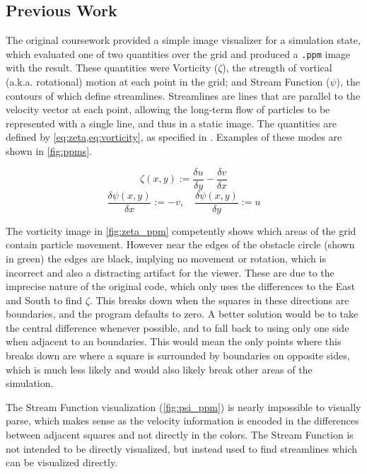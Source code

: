 \subsection{Previous Work}
The original coursework\cite{modules:CS257Coursework} provided a simple image visualizer for a simulation state, which evaluated one of two quantities over the grid and produced a \texttt{.ppm} image with the result.
These quantities were Vorticity ($\zeta$), the strength of vortical (a.k.a. rotational) motion at each point in the grid; and Stream Function ($\psi$), the contours of which define streamlines.
Streamlines are lines that are parallel to the velocity vector at each point, allowing the long-term flow of particles to be represented with a single line, and thus in a static image.\cite{NASADefinitionStreamlines}
The quantities are defined by \cref{eq:zeta,eq:vorticity}, as specified in \cite{book:griebel1998numerical}.
Examples of these modes are shown in \cref{fig:ppms}.

\begin{equation}
    \zeta(x,y) := \frac{\delta{u}}{\delta{y}} - \frac{\delta{v}}{\delta{x}}
    \label{eq:zeta}
\end{equation}
\begin{equation}
    \frac{\delta{\psi}(x,y)}{\delta{x}} := -v,\quad \frac{\delta{\psi}(x,y)}{\delta{y}} := u
    \label{eq:vorticity}
\end{equation}


The vorticity image in \cref{fig:zeta_ppm} competently shows which areas of the grid contain particle movement.
However near the edges of the obstacle circle (shown in green) the edges are black, implying no movement or rotation, which is incorrect and also a distracting artifact for the viewer.
These are due to the imprecise nature of the original code, which only uses the differences to the East and South to find $\zeta$.
This breaks down when the squares in these directions are boundaries, and the program defaults to zero.
A better solution would be to take the central difference whenever possible, and to fall back to using only one side when adjacent to an boundaries.
This would mean the only points where this breaks down are where a square is surrounded by boundaries on opposite sides, which is much less likely and would also likely break other areas of the simulation.

The Stream Function visualization (\cref{fig:psi_ppm}) is nearly impossible to visually parse, which makes sense as the velocity information is encoded in the differences between adjacent squares and not directly in the colors.
The Stream Function is not intended to be directly visualized, but instead used to find streamlines which can be visualized directly.

